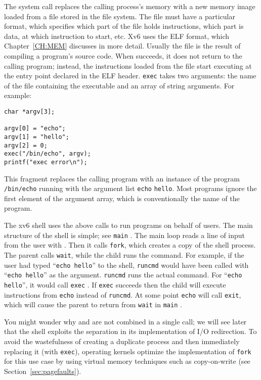 The
system call
replaces the calling process's memory with a new memory
image loaded from a file stored in the file system.
The file must have a particular format, which specifies which part of
the file holds instructions, which part is data, at which instruction
to start, etc. Xv6
uses the ELF format, which Chapter~\ref{CH:MEM} discusses in
more detail.
Usually the file is the result of compiling a program's source code.
When
succeeds, it does not return to the calling program;
instead, the instructions loaded from the file start
executing at the entry point declared in the ELF header.
\lstinline{exec}
takes two arguments: the name of the file containing the
executable and an array of string arguments.
For example:
\begin{lstlisting}[]
char *argv[3];

argv[0] = "echo";
argv[1] = "hello";
argv[2] = 0;
exec("/bin/echo", argv);
printf("exec error\n");
\end{lstlisting}
This fragment replaces the calling program with an instance
of the program
\lstinline{/bin/echo}
running with the argument list
\lstinline{echo}
\lstinline{hello}.
Most programs ignore the first element of the argument array, which is
conventionally the name of the program.

The xv6 shell uses the above calls to run programs on behalf of
users. The main structure of the shell is simple; see
\lstinline{main}
.
The main loop reads a line of input from the user with
.
Then it calls
\lstinline{fork},
which creates a copy of the shell process. The
parent calls
\lstinline{wait},
while the child runs the command.  For example, if the user
had typed
``\lstinline{echo hello}''
to the shell,
\lstinline{runcmd}
would have been called with
``\lstinline{echo hello}''
as the argument.
\lstinline{runcmd}
runs the actual command. For
``\lstinline{echo hello}'',
it would call
\lstinline{exec}
.
If
\lstinline{exec}
succeeds then the child will execute instructions from
\lstinline{echo}
instead of
\lstinline{runcmd}.
At some point
\lstinline{echo}
will call
\lstinline{exit},
which will cause the parent to return from
\lstinline{wait}
in
\lstinline{main}
.

You might wonder why
and
are not combined in a single call; we will see later that
the shell exploits the separation in its implementation of
I/O redirection.
To avoid the wastefulness of
creating a duplicate process and then immediately replacing it (with \lstinline{exec}),
operating kernels optimize the implementation of
\lstinline{fork}
for this use case by using virtual memory techniques such as
copy-on-write (see Section~\ref{sec:pagefaults}).


